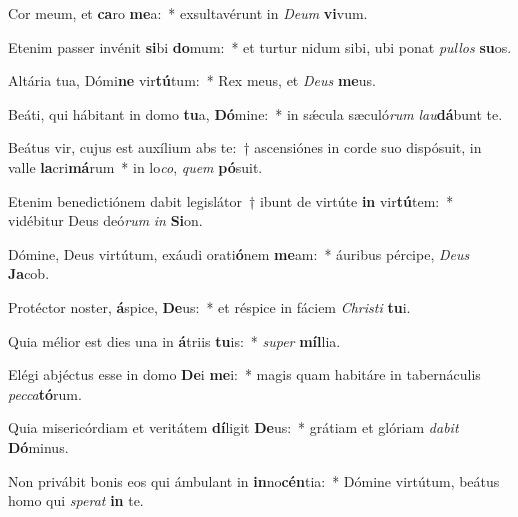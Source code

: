 \item Cor meum, et \textbf{ca}ro \textbf{me}a:~* exsultavérunt in \textit{De}\textit{um} \textbf{vi}vum.
\item Etenim passer invénit \textbf{si}bi \textbf{do}mum:~* et turtur nidum sibi, ubi ponat \textit{pul}\textit{los} \textbf{su}os.
\item Altária tua, Dómi\textbf{ne} vir\textbf{tú}tum:~* Rex meus, et \textit{De}\textit{us} \textbf{me}us.
\item Beáti, qui hábitant in domo \textbf{tu}a, \textbf{Dó}mine:~* in sǽcula sæculó\textit{rum} \textit{lau}\textbf{dá}bunt te.
\item Beátus vir, cujus est auxílium abs te:~† ascensiónes in corde suo dispósuit, in valle \textbf{la}cri\textbf{má}rum~* in lo\textit{co}, \textit{quem} \textbf{pó}suit.
\item Etenim benedictiónem dabit legislátor~† ibunt de virtúte \textbf{in} vir\textbf{tú}tem:~* vidébitur Deus deó\textit{rum} \textit{in} \textbf{Si}on.
\item Dómine, Deus virtútum, exáudi orati\textbf{ó}nem \textbf{me}am:~* áuribus pércipe, \textit{De}\textit{us} \textbf{Ja}cob.
\item Protéctor noster, \textbf{á}spice, \textbf{De}us:~* et réspice in fáciem \textit{Chris}\textit{ti} \textbf{tu}i.
\item Quia mélior est dies una in \textbf{á}triis \textbf{tu}is:~* \textit{su}\textit{per} \textbf{míl}lia.
\item Elégi abjéctus esse in domo \textbf{De}i \textbf{me}i:~* magis quam habitáre in tabernáculis \textit{pec}\textit{ca}\textbf{tó}rum.
\item Quia misericórdiam et veritátem \textbf{dí}ligit \textbf{De}us:~* grátiam et glóriam \textit{da}\textit{bit} \textbf{Dó}minus.
\item Non privábit bonis eos qui ámbulant in \textbf{in}no\textbf{cén}tia:~* Dómine virtútum, beátus homo qui \textit{spe}\textit{rat} \textbf{in} te.
